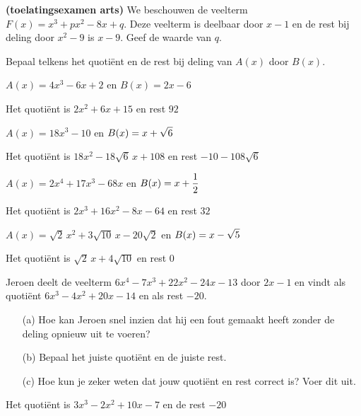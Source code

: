 \documentclass{ximera}
\begin{document}
\begin{exercise}
{\bf (toelatingsexamen arts)}
We beschouwen de veelterm \(F(x) = x^3 + px^2 - 8x + q\). Deze veelterm is deelbaar door \(x-1\) en de rest bij deling door \(x^2-9\) is \(x-9\). Geef de waarde van \(q\).
\begin{multipleChoice}
\end{multipleChoice}
\end{exercise}

\begin{exercise}
Bepaal telkens het quotiënt en de rest bij deling van \(A(x)\) door \(B(x)\).

	\begin{question} \(A(x) = 4x^3-6x+2\) \quad en \quad \(B(x) = 2x-6\)                                             \begin{uitkomst} Het quotiënt is \(2x^2+6x+15\)                 en rest \(92\)              \end{uitkomst} \end{question}
	\begin{question} \(A(x) = 18x^3-10\) \quad en \quad \(\displaystyle B(x) = x + \sqrt{6}\)                                   \begin{uitkomst} Het quotiënt is \(18x^2 - 18\sqrt{6}\,x+108\)  en rest \(-10-108\sqrt{6}\) \end{uitkomst} \end{question}
	\begin{question} \(A(x) = 2x^4 + 17x^3 - 68x\) \quad en \quad \(\displaystyle B(x) = x+\frac{1}{2}\)                        \begin{uitkomst} Het quotiënt is \(2x^3+16x^2-8x-64\)           en rest \(32\)              \end{uitkomst} \end{question}
	\begin{question} \(A(x) = \sqrt{2}\,x^2 + 3\sqrt{10}\,x - 20\sqrt{2}\) \quad en \quad \(\displaystyle B(x) = x - \sqrt{5}\) \begin{uitkomst} Het quotiënt is \(\sqrt{2}\,x+4\sqrt{10}\)     en rest \(0\)               \end{uitkomst} \end{question}
\end{exercise}

\begin{exercise}
Jeroen deelt de veelterm \(6x^4-7x^3+22x^2-24x-13\) door \(2x-1\) en vindt als quotiënt \(6x^3-4x^2+20x-14\) en als rest \(-20\). 
\begin{enumerate}
\item[(a)]
Hoe kan Jeroen snel inzien dat hij een fout gemaakt heeft zonder de deling opnieuw uit te voeren? 
\item[(b)]
Bepaal het juiste quotiënt en de juiste rest.
\item[(c)]
Hoe kun je zeker weten dat jouw quotiënt en rest correct is? Voer dit uit.
\end{enumerate}
\begin{uitkomst} Het quotiënt is \(3x^3-2x^2+10x-7\) en de rest \(-20\) \end{uitkomst}
\end{exercise}
\end{document}
